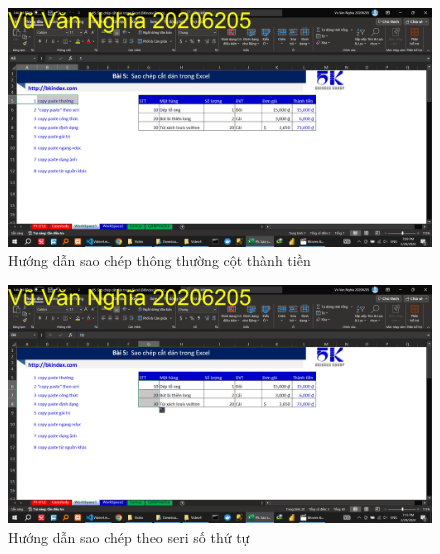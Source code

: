 \documentclass{article}
\begin{document}
\begin{figure}[h]
    \centering
    \includegraphics[scale = 0.15]{Video4/HuongDan/1.png}
    \caption{Hướng dẫn sao chép thông thường cột thành tiền}
\end{figure}
\begin{figure}[h]
    \centering
    \includegraphics[scale = 0.15]{Video4/HuongDan/2.png}
    \caption{Hướng dẫn sao chép theo seri số thứ tự}
\end{figure}


 





\end{document}

